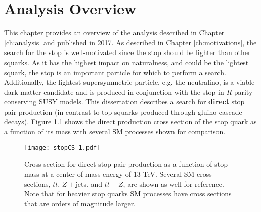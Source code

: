 \chapter{Analysis Overview}
\label{ch:analysisOverview}


This chapter provides an overview of the analysis described in Chapter \ref{ch:analysis} and published in 2017\cite{stop0L13tev}.  As described in Chapter \ref{ch:motivations}, the search for the stop is well-motivated since the stop should be lighter than other squarks.  As it has the highest impact on naturalness, and could be the lightest squark, the stop is an important particle for which to perform a search.  Additionally, the lightest supersymmetric particle, e.g. the neutralino, is a viable dark matter candidate and is produced in conjunction with the stop in $R$-parity conserving SUSY models.  This dissertation describes a search for {\bf direct} stop pair production (in contrast to top squarks produced through gluino cascade decays).  Figure \ref{fig:stopCS} shows the direct production cross section of the stop quark as a function of its mass with several SM processes shown for comparison.  \\%





\begin{figure}[h]
	\centering
	\texttt{[image: stopCS\_1.pdf]}
	\caption[Cross section for direct stop pair production and selected backgrounds.]{\label{fig:stopCS}{Cross section for direct stop pair production as a function of stop mass at a center-of-mass energy of 13 TeV.  Several SM cross sections, $t\bar{t}$, $Z+$jets\cite{ttZcs}, and $tt+Z$\cite{ttZcs}, are shown as well for reference.  Note that for heavier stop quarks SM processes have cross sections that are orders of magnitude larger.}}
\end{figure}

